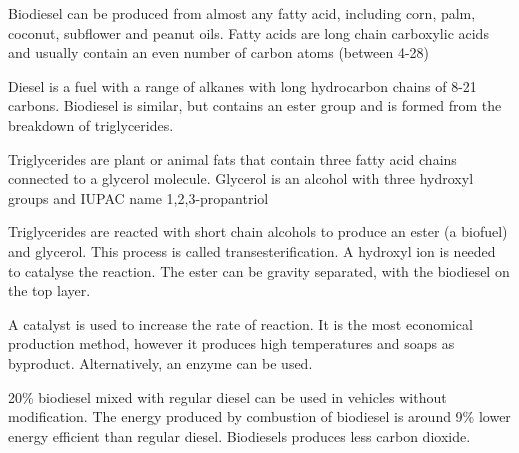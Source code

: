 			Biodiesel can be produced from almost any fatty acid, including corn, palm, coconut, subflower and peanut oils. Fatty acids are long chain carboxylic acids and usually contain an even number of carbon atoms (between 4-28)

			Diesel is a fuel with a range of alkanes with long hydrocarbon chains of 8-21 carbons. Biodiesel is similar, but contains an ester group and is formed from the breakdown of triglycerides.

			Triglycerides are plant or animal fats that contain three fatty acid chains connected to a glycerol molecule. Glycerol is an alcohol with three hydroxyl groups and IUPAC name 1,2,3-propantriol

			\begin{center}
			\end{center}

			\begin{center}
			\end{center}

			Triglycerides are reacted with short chain alcohols to produce an ester (a biofuel) and glycerol. This process is called transesterification. A hydroxyl ion is needed to catalyse the reaction. The ester can be gravity separated, with the biodiesel on the top layer.

			A catalyst is used to increase the rate of reaction. It is the most economical production method, however it produces high temperatures and soaps as byproduct. Alternatively, an enzyme can be used.

			20\% biodiesel mixed with regular diesel can be used in vehicles without modification. The energy produced by combustion of biodiesel is around 9\% lower energy efficient than regular diesel. Biodiesels produces less carbon dioxide.

			
